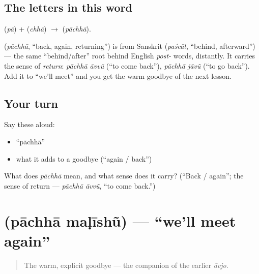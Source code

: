 \subsection*{The letters in this word}
\textbf{} (\emph{pā}) + \textbf{} (\emph{chhā}) $\to$ \textbf{} (\emph{pāchhā}).

\begin{cousinweb}
\textbf{} (\emph{pāchhā}, \textquotedblleft{}back, again, returning\textquotedblright{}) is from Sanskrit \textbf{} (\emph{paścāt}, \textquotedblleft{}behind, afterward\textquotedblright{}) — the same \textquotedblleft{}behind/after\textquotedblright{} root behind English \emph{post-} words, distantly. It carries the sense of \emph{return}: \emph{pāchhā āvvũ} (\textquotedblleft{}to come back\textquotedblright{}), \emph{pāchhā jāvũ} (\textquotedblleft{}to go back\textquotedblright{}). Add it to \textquotedblleft{}we'll meet\textquotedblright{} and you get the warm goodbye of the next lesson.
\end{cousinweb}

\subsection*{Your turn}
Say these aloud:

\begin{itemize}
\raggedright
  \item \textquotedblleft{}pāchhā\textquotedblright{}
  \item what it adds to a goodbye (\textquotedblleft{}again / back\textquotedblright{})
\end{itemize}

\begin{tcolorbox}[breakable,colback=teal!4,colframe=teal!35!black,title={Before you move on}]
What does \emph{pāchhā} mean, and what sense does it carry? (\textquotedblleft{}Back / again\textquotedblright{}; the sense of return — \emph{pāchhā āvvũ}, \textquotedblleft{}to come back.\textquotedblright{})
\end{tcolorbox}
\section[\gu{પાછા} \gu{મળીશું}]{  (pāchhā maḷīshũ) — \textquotedblleft{}we'll meet again\textquotedblright{}}

\label{lesson:GU-C04-pachha-malishun}



\begin{quote}
The warm, explicit goodbye — the companion of the earlier \emph{āvjo}.
\end{quote}


